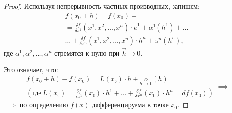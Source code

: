 \begin{proof}
    Используя непрерывность частных производных, запишем:
    \begin{multline*}
        f(x_0 + h) - f(x_0) = \\
        = \frac{\delta f}{\delta x^1}(x^1, x^2, \ldots, x^n) \cdot h^1 + \alpha^1(h^1) + \ldots \\
        \ldots + \frac{\delta f}{\delta x^n}(x^1, x^2, \ldots, x^n) \cdot h^n + \alpha^n(h^n),
    \end{multline*}
    где $\alpha^1,\alpha^2,\ldots,\alpha^n$ стремятся к нулю при $\vec{h}\rightarrow0$.

    Это означает, что:
    \[
        \begin{array}{c}
            f(x_0 + h) - f(x_0) = L(x_0)\cdot h + \underset{h\rightarrow0}{o}(h) \\
            \left(\text{где} \ L(x_0) = \frac{\delta f}{\delta x^1}(x_0)\cdot h^1 + \ldots + \frac{\delta f}{\delta x^n}(x_0) \cdot h^n = df(x_0)\right)
        \end{array} \implies
    \]$\implies$ по определению $f(x)$ дифференцируема в точке $x_0$.
\end{proof}